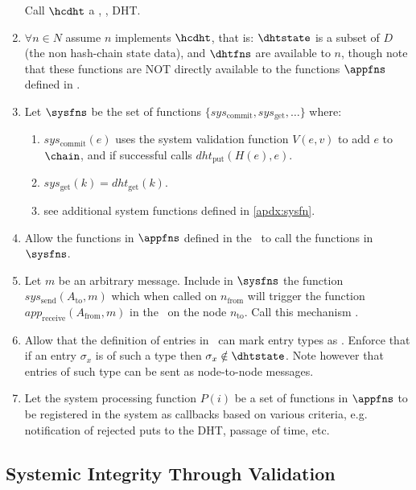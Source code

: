 \documentclass[twocolumn,showpacs,
  nofootinbib,aps,superscriptaddress,
  eqsecnum,prd,notitlepage,showkeys,10pt]{revtex4-1}
\begin{document}
\begin{enumerate}
\begin{enumerate}
\end{enumerate}

Call $\hcdht$ a , ,  DHT.

\item $\forall n \in N$ assume $n$ implements $\hcdht$, that is: $\dhtstate$ is a subset of $D$ (the non hash-chain state data), and $\dhtfns$ are available to $n$, though note that these functions are NOT directly available to the functions $\appfns$ defined in \hcdna.

\item Let $\sysfns$ be the set of functions $\{sys_\text{commit},sys_\text{get}, \dots\}$ where:
\begin{enumerate}
\item $sys_\text{commit}(e)$ uses the system validation function $V(e,v)$ to add $e$ to $\chain$, and if successful calls $dht_\text{put}(H(e),e)$.
\item $sys_\text{get}(k) = dht_\text{get}(k)$.
\item see additional system functions defined in \ref{apdx:sysfn}.
\end{enumerate}

\item Allow the functions in $\appfns$ defined in the \hcdna\ to call the functions in $\sysfns$.
\item Let $m$ be an arbitrary message. Include in $\sysfns$ the function $sys_\text{send}(A_\text{to},m)$ which when called on $n_\text{from}$ will trigger the function $app_\text{receive}(A_\text{from},m)$ in the \hcdna\ on the node $n_\text{to}$. Call this mechanism .
\item \label{private} Allow that the definition of entries in \hcdna\ can mark entry types as . Enforce that if an entry $\sigma_x$ is of such a type then $\sigma_x \notin \dhtstate$. Note however that entries of such type can be sent as node-to-node messages.
\item Let the system processing function $P(i)$ be a set of functions in $\appfns$ to be registered in the system as callbacks based on various criteria, e.g. notification of rejected puts to the DHT, passage of time, etc.
\end{enumerate}

\subsection{Systemic Integrity Through Validation}
\label{sec:integrity}
\end{document}
